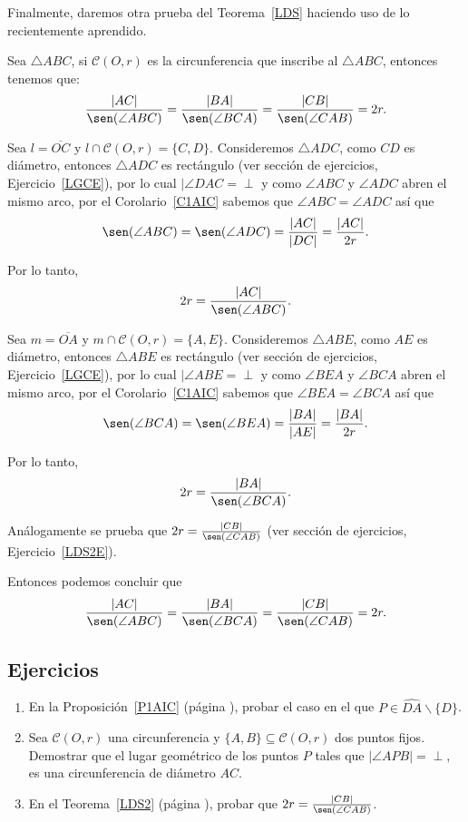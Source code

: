 Finalmente, daremos otra prueba del Teorema~\ref{LDS} haciendo uso de lo recientemente aprendido. 
\begin{teo}\label{LDS2}
Sea $\triangle ABC$, si $\mathcal{C}(O,r)$ es la circunferencia que inscribe al $\triangle ABC$, entonces tenemos que:
$$\frac{|AC|}{\sen(\angle ABC)}=\frac{|BA|}{\sen(\angle BCA)}=\frac{|CB|}{\sen(\angle CAB)}=2r.$$
\end{teo}
\begin{dem}
Sea $l=\overline{OC}$ y $l\cap\mathcal{C}(O,r)=\{C,D\}.$ Consideremos $\triangle ADC$, como $CD$ es diámetro, entonces $\triangle ADC$ es rectángulo (ver sección de ejercicios, Ejercicio~\ref{LGCE}), por lo cual $|\angle DAC=\perp$ y como $\angle ABC$ y $\angle ADC$ abren el mismo arco, por el Corolario~\ref{C1AIC} sabemos que  $\angle ABC=\angle ADC$ así que 
$$\sen(\angle ABC)=\sen(\angle ADC)=\frac{|AC|}{|DC|}=\frac{|AC|}{2r}.$$

Por lo tanto, $$2r=\frac{|AC|}{\sen(\angle ABC)}.$$

Sea $m=\overline{OA}$ y $m\cap\mathcal{C}(O,r)=\{A,E\}.$ Consideremos $\triangle ABE$, como $AE$ es diámetro, entonces $\triangle ABE$ es rectángulo (ver sección de ejercicios, Ejercicio~\ref{LGCE}), por lo cual $|\angle ABE=\perp$ y como $\angle BEA$ y $\angle BCA$ abren el mismo arco, por el Corolario~\ref{C1AIC} sabemos que  $\angle BEA=\angle BCA$ así que 
$$\sen(\angle BCA)=\sen(\angle BEA)=\frac{|BA|}{|AE|}=\frac{|BA|}{2r}.$$

Por lo tanto, $$2r=\frac{|BA|}{\sen(\angle BCA)}.$$

Análogamente se prueba que $2r=\frac{|CB|}{\sen(\angle CAB)}$ (ver sección de ejercicios, Ejercicio~\ref{LDS2E}).

Entonces podemos concluir que 
$$\frac{|AC|}{\sen(\angle ABC)}=\frac{|BA|}{\sen(\angle BCA)}=\frac{|CB|}{\sen(\angle CAB)}=2r.$$
\end{dem}

\subsection*{Ejercicios}
\begin{enumerate}

\item En la Proposición~\ref{P1AIC} (página \pageref{P1AIC}), probar el  caso en el que $P\in\widehat{DA}\backslash\{D\}$.\label{P1AICC4}
\item Sea $\mathcal{C}(O,r)$ una circunferencia y $\{A,B\}\subseteq\mathcal{C}(O,r)$ dos puntos fijos. Demostrar que el lugar geométrico de los puntos $P$ tales que $|\angle APB|=\perp$, es una circunferencia de diámetro $AC$.\label{LGCE}   
\item En el Teorema~\ref{LDS2} (página \pageref{LDS2}), probar que $2r=\frac{|CB|}{\sen(\angle CAB)}$.\label{LDS2E}
\end{enumerate}

